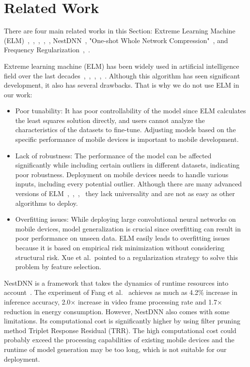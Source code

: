 \documentclass[runningheads]{llncs}
\begin{document}
\section{Related Work}\label{related_work}
There are four main related works in this Section: Extreme Learning Machine (ELM)~\cite{anton2021elm},~\cite{ding2014elmapp},~\cite{wang2022elmapp},~\cite{deng2015elmapp},~\cite{huang2006elmapp}, NestDNN~\cite{fang2018nestdnn}, "One-shot Whole Network Compression"~\cite{kim2016oneshot}, and Frequency Regularization~\cite{zhao2023fr},~\cite{fr_repo}. 

Extreme learning machine (ELM) has been widely used in artificial intelligence field over the last decades~\cite{anton2021elm},~\cite{ding2014elmapp},~\cite{wang2022elmapp},~\cite{deng2015elmapp},~\cite{huang2006elmapp}. Although this algorithm has seen significant development, it also has several drawbacks. That is why we do not use ELM in our work: 
\begin{itemize}
	\item Poor tunability: It has poor controllability of the model since ELM calculates the least squares solution directly, and users cannot analyze the characteristics of the datasets to fine-tune. Adjusting models based on the specific performance of mobile devices is important to mobile development.
	\item Lack of robustness: The performance of the model can be affected significantly while including certain outliers in different datasets, indicating poor robustness. Deployment on mobile devices needs to handle various inputs, including every potential outlier. Although there are many advanced versions of ELM~\cite{john2015advancedelm},~\cite{zhang2015advancedelm},~\cite{zhu2005advancedelm},~\cite{sun2017advancedelm} they lack universality and are not as easy as other algorithms to deploy.
	\item Overfitting issues: While deploying large convolutional neural networks on mobile devices, model generalization is crucial since overfitting can result in poor performance on unseen data. ELM easily leads to overfitting issues because it is based on empirical risk minimization without considering structural risk. Xue et al.~\cite{ying2019overfit}pointed to a regularization strategy to solve this problem by feature selection.
\end{itemize}	 

NestDNN is a framework that takes the dynamics of runtime resources into account~\cite{fang2018nestdnn}. The experiment of Fang et al.~\cite{fang2018nestdnn} achieves as much as 4.2\% increase in inference accuracy, 2.0× increase in video frame processing rate and 1.7× reduction in energy consumption. However, NestDNN also comes with some limitations. Its computational cost is significantly higher by using filter pruning method Triplet Response Residual (TRR). The high computational cost could probably exceed the processing capabilities of existing mobile devices and the runtime of model generation may be too long, which is not suitable for our deployment. 
\end{document}
